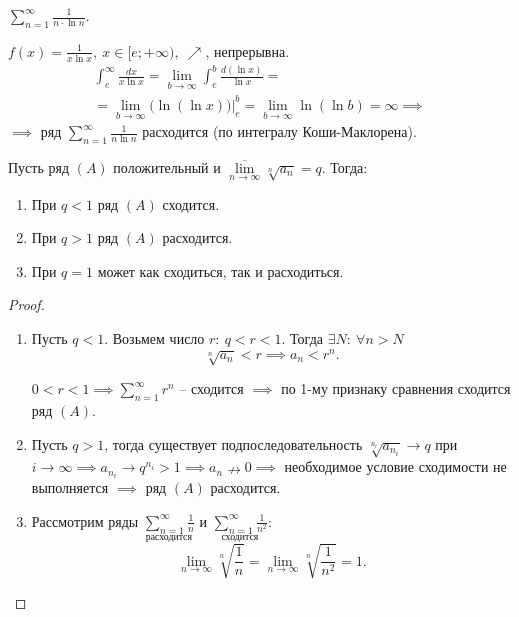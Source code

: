 \begin{example}
    $\sum_{n=1}^{\infty}\frac{1}{n\cdot \ln n}$.

    $f(x) = \frac{1}{x\ln x}, \ x \in [e;+\infty), \ \nearrow$, непрерывна.
    \begin{multline*}
        \int_{e}^{\infty}\frac{dx}{x\ln x} = \underset{b\rightarrow\infty}{\lim}\int_{e}^{b}\frac{d(\ln x)}{\ln x} =\\
        = \underset{b\rightarrow\infty}{\lim}\big(\ln(\ln x)\big)\Big|_e^b = \underset{b\rightarrow\infty}{\lim}\ln (\ln b) = \infty \implies
    \end{multline*}
    $\implies$ ряд $\sum_{n=1}^{\infty}\frac{1}{n\ln n}$ расходится (по интегралу Коши-Маклорена).
\end{example}

\begin{theorem}
    Пусть ряд $(A)$ положительный и $\underset{n\rightarrow\infty}{\overline{\lim}}\sqrt[n]{a_n} = q$. Тогда:
    \begin{enumerate}
        \item При $q < 1$ ряд $(A)$ сходится.
        \item При $q > 1$ ряд $(A)$ расходится.
        \item При $q = 1$ может как сходиться, так и расходиться.
    \end{enumerate}
\end{theorem}

\begin{proof}\leavevmode
    \begin{enumerate}
        \item Пусть $q < 1$. Возьмем число $r: \ q < r < 1$. Тогда $\exists N: \ \forall n > N$
              \[
                  \sqrt[n]{a_n} < r \implies a_n < r^n.
              \]

              $0 < r < 1 \implies \sum_{n=1}^{\infty}r^n$ -- сходится $\implies$ по 1-му признаку сравнения сходится ряд $(A)$.

        \item Пусть $q > 1$, тогда существует подпоследовательность $\sqrt[n_i]{a_{n_i}} \rightarrow q$ при $i\rightarrow\infty \implies a_{n_i}\rightarrow q^{n_i} > 1 \implies a_n \nrightarrow  0 \implies $ необходимое условие сходимости не выполняется $ \implies $ ряд $(A)$ расходится.

        \item Рассмотрим ряды $\underset{\text{расходится}}{\sum_{n=1}^{\infty}\frac{1}{n}}$ и $\underset{\text{сходится}}{\sum_{n=1}^{\infty}\frac{1}{n^2}}$:
              \[
                  \underset{n\rightarrow\infty}{\lim}\sqrt[n]{\frac{1}{n}} = \underset{n\rightarrow\infty}{\lim}\sqrt[n]{\frac{1}{n^2}} = 1.
              \]
    \end{enumerate}
\end{proof}


